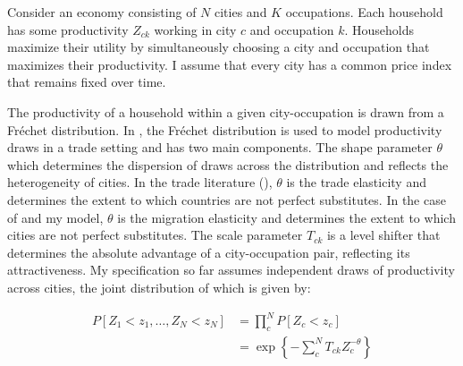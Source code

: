 \documentclass[10pt]{article}
\begin{document}


Consider an economy consisting of $N$ cities and $K$ occupations. Each household has some productivity $Z_{ck}$ working in city $c$ and occupation $k$. Households maximize their utility by simultaneously choosing a city and occupation that maximizes their productivity. I assume that every city has a common price index that remains fixed over time.

The productivity of a household within a given city-occupation is drawn from a Fr\'{e}chet distribution. In \cite{redding}, the Fr\'{e}chet distribution is used to model productivity draws in a trade setting and has two main components. The shape parameter $\theta$ which determines the dispersion of draws across the distribution and reflects the heterogeneity of cities. In the trade literature (\cite{ek}), $\theta$ is the trade elasticity and determines the extent to which countries are not perfect substitutes. In the case of \cite{redding} and my model, $\theta$ is the migration elasticity and determines the extent to which cities are not perfect substitutes. The scale parameter $T_{ck}$ is a level shifter that determines the absolute advantage of a city-occupation pair, reflecting its attractiveness. My specification so far assumes independent draws of productivity across cities, the joint distribution of which is given by:

\begin{align*}
    P[Z_1 < z_1, \dots, Z_N < z_N] & = \prod_{c}^{N} P[Z_c < z_c]                                 \\
                                   & = \exp \left\{ - \sum_{c}^{N} T_{ck} Z_c^{- \theta} \right\}
\end{align*}
\end{document}
